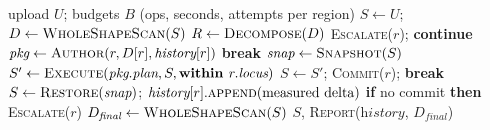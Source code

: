 \documentclass[11pt,onecolumn]{article}
\begin{document}
\begin{algorithm}[t]
\caption{Region-scoped repair. Kernel mutation is serialised; only package authoring may overlap.}
\label{alg:region}
\small
\begin{algorithmic}[1]
\Require upload $U$; budgets $B$ (ops, seconds, attempts per region)
\State $S \gets U$; \quad $D \gets \textsc{WholeShapeScan}(S)$ 
\State $R \gets \textsc{Decompose}(D)$ 
   \State \textsc{Escalate}($r$); \textbf{continue} \EndIf
    \State $\textit{pkg} \gets \textsc{Author}(r, D[r], \textit{history}[r])$ 
     \State \textbf{break} \EndIf
    \State $\textit{snap} \gets \textsc{Snapshot}(S)$
    \State $S' \gets \textsc{Execute}(\textit{pkg}.\textit{plan}, S, \textbf{within } r.\textit{locus})$
      \State $S \gets S'$; \textsc{Commit}($r$); \textbf{break}
    \EndIf
    \State $S \gets \textsc{Restore}(\textit{snap})$;
           $\textit{history}[r].\textsc{append}(\text{measured delta})$ 
  \EndFor
  \State \textbf{if} no commit \textbf{then} \textsc{Escalate}($r$) 
\EndFor
\State $D_{\textit{final}} \gets \textsc{WholeShapeScan}(S)$ 
\State \Return $S$, \textsc{Report}($\textit{history}$, $D_{\textit{final}}$)
\end{algorithmic}
\end{algorithm}
\end{document}
